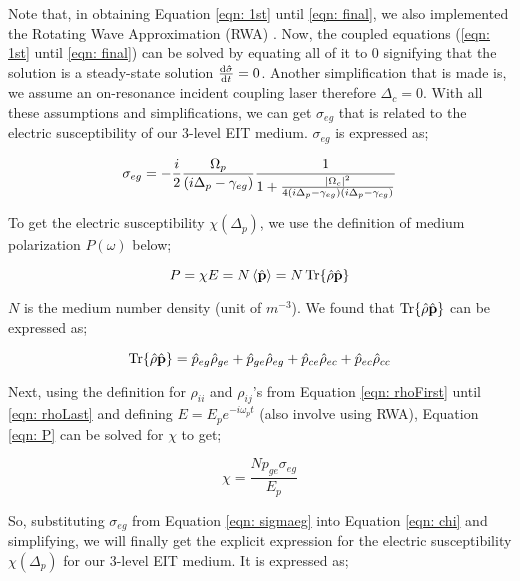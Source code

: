\newpage

Note that, in obtaining Equation \ref{eqn: 1st} until \ref{eqn: final}, we also implemented the Rotating Wave Approximation (RWA) \cite{boyd2020nonlinear}. Now, the coupled equations (\ref{eqn: 1st} until \ref{eqn: final}) can be solved by equating all of it to $0$ signifying that the solution is a steady-state solution $\dv{\vb{\hat{\sigma}}}{t} = 0$. Another simplification that is made is, we assume an on-resonance incident coupling laser therefore $\Delta_{c} = 0$. With all these assumptions and simplifications, we can get $\sigma_{eg}$ that is related to the electric susceptibility of our 3-level EIT medium. $\sigma_{eg}$ is expressed as;

\begin{equation}
    \sigma_{eg} = - \frac{i}{2} \frac{\Omega_{p}}{(i \Delta_{p} - \gamma_{eg})} \frac{1}{1 + \frac{\abs{\Omega_{c}}^{2}}{4(i\Delta_{p} - \gamma_{eg})(i \Delta_{p} - \gamma_{cg})}}
    \label{eqn: sigmaeg}
\end{equation}

To get the electric susceptibility $\chi(\Delta_{p})$, we use the definition of medium polarization $P(\omega)$ below;

\begin{equation}
    P = \chi E = N \expval{\hat{\vb{p}}} = N \Tr{\hat{\vb{\rho}} \hat{\vb{p}}}
    \label{eqn: P}
\end{equation}

$N$ is the medium number density (unit of $m^{-3}$). We found that $\Tr{\hat{\vb{\rho}} \hat{\vb{p}}}$ can be expressed as;

\begin{equation}
    \Tr{\hat{\vb{\rho}} \hat{\vb{p}}} = \hat{p}_{eg} \hat{\rho}_{ge} + \hat{p}_{ge} \hat{\rho}_{eg} + \hat{p}_{ce} \hat{\rho}_{ec} + \hat{p}_{ec} \hat{\rho}_{cc}
\end{equation}

Next, using the definition for $\rho_{ii}$ and $\rho_{ij}$'s from Equation \ref{eqn: rhoFirst} until \ref{eqn: rhoLast} and defining $E = E_{p} e^{-i \omega_{p} t}$ (also involve using RWA), Equation \ref{eqn: P} can be solved for $\chi$ to get;

\begin{equation}
    \chi = \frac{N p_{ge} \sigma_{eg}}{E_{p}}
    \label{eqn: chi}
\end{equation}

\newpage

So, substituting $\sigma_{eg}$ from Equation \ref{eqn: sigmaeg} into Equation \ref{eqn: chi} and simplifying, we will finally get the explicit expression for the electric susceptibility $\chi(\Delta_{p})$ for our 3-level EIT medium. It is expressed as;


